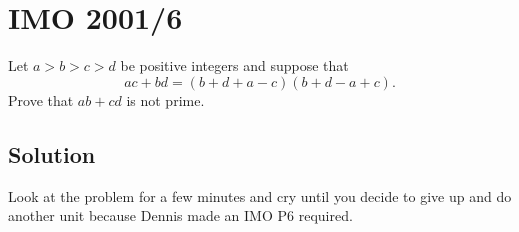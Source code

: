 \documentclass{article}
\begin{document}
\pagebreak\section{IMO 2001/6}
Let $a > b > c > d$ be positive integers and suppose that \[ ac + bd = (b+d+a-c)(b+d-a+c). \] Prove that $ab + cd$ is not prime.

\subsection{Solution}
Look at the problem for a few minutes and cry until you decide to give up and do another unit because Dennis made an IMO P6 required.
\end{document}
